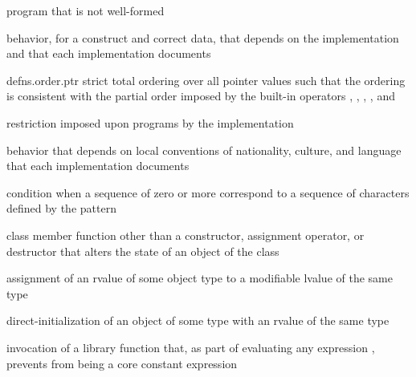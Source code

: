 %
program that is not well-formed

%
behavior, for a  construct and correct data, that
depends on the implementation and that each implementation documents

{defns.order.ptr}
%
strict total ordering over all pointer values
such that the ordering is consistent with the partial order
imposed by the built-in operators
\tcode{<}, \tcode{>}, \tcode{<=}, \tcode{>=}, and \tcode{<=>}

%
restriction imposed upon programs by the implementation

%
behavior that depends on local conventions of nationality, culture, and
language that each implementation documents

%
%
condition when a sequence of zero or more 
correspond to a sequence of characters defined by the pattern

%
class member function other than a constructor,
assignment operator, or destructor
that alters the state of an object of the class

%
assignment of an rvalue of some object type to a modifiable lvalue of the same type

%
direct-initialization of an object of some type with an rvalue of the same type

%
invocation of a library function that,
as part of evaluating any expression ,
prevents  from being a core constant expression


